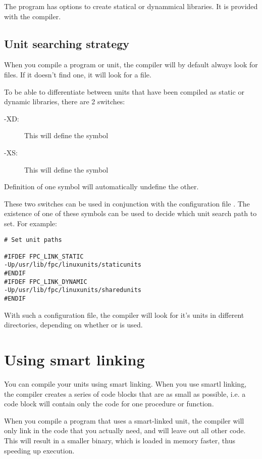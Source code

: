 \documentclass{report}
\begin{document}
The  program has options to create statical or dynammical
libraries. It is provided with the compiler.

\subsection{Unit searching strategy}

When you compile a program or unit, the compiler will by
default always look for  files. If it doesn't find one, it will
look for a  file.

To be able to differentiate between units that have been compiled as static
or dynamic libraries, there are 2 switches:

\begin{description}
\item [-XD:\ ] This will define the symbol 
\item [-XS:\ ] This will define the symbol 
\end{description}
Definition of one symbol will automatically undefine the other.

These two switches can be used in conjunction with the configuration file
. The existence of one of these symbols can be used to
decide which unit search path to set. For example:
\begin{verbatim}
# Set unit paths

#IFDEF FPC_LINK_STATIC
-Up/usr/lib/fpc/linuxunits/staticunits
#ENDIF
#IFDEF FPC_LINK_DYNAMIC
-Up/usr/lib/fpc/linuxunits/sharedunits
#ENDIF
\end{verbatim}
With such a configuration file, the compiler will look for it's units in
different directories, depending on whether  or  is used.

\section{Using smart linking}
\label{se:SmartLinking}

You can compile your units using smart linking. When you use smartl linking,
the compiler creates a series of code blocks that are as small as possible,
i.e. a code block will contain only the code for one procedure or function.

When you compile a program that uses a smart-linked unit, the compiler will
only link in the code that you actually need, and will leave out all other
code. This will result in a smaller binary, which is loaded in memory
faster, thus speeding up execution.
\end{document}
